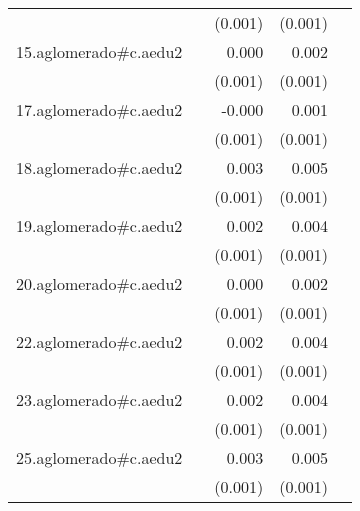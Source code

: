 {\begin{longtable}{l*{4}{D{.}{.}{-1}}}
            &                     &     (0.001)         &     (0.001)         &                     \\
\addlinespace
15.aglomerado#c.aedu2&                     &       0.000         &       0.002\sym{*}  &                     \\
            &                     &     (0.001)         &     (0.001)         &                     \\
\addlinespace
17.aglomerado#c.aedu2&                     &      -0.000         &       0.001         &                     \\
            &                     &     (0.001)         &     (0.001)         &                     \\
\addlinespace
18.aglomerado#c.aedu2&                     &       0.003\sym{*}  &       0.005\sym{***}&                     \\
            &                     &     (0.001)         &     (0.001)         &                     \\
\addlinespace
19.aglomerado#c.aedu2&                     &       0.002         &       0.004\sym{***}&                     \\
            &                     &     (0.001)         &     (0.001)         &                     \\
\addlinespace
20.aglomerado#c.aedu2&                     &       0.000         &       0.002         &                     \\
            &                     &     (0.001)         &     (0.001)         &                     \\
\addlinespace
22.aglomerado#c.aedu2&                     &       0.002         &       0.004\sym{***}&                     \\
            &                     &     (0.001)         &     (0.001)         &                     \\
\addlinespace
23.aglomerado#c.aedu2&                     &       0.002         &       0.004\sym{***}&                     \\
            &                     &     (0.001)         &     (0.001)         &                     \\
\addlinespace
25.aglomerado#c.aedu2&                     &       0.003\sym{*}  &       0.005\sym{***}&                     \\
            &                     &     (0.001)         &     (0.001)         &                     \\

\end{longtable}}
